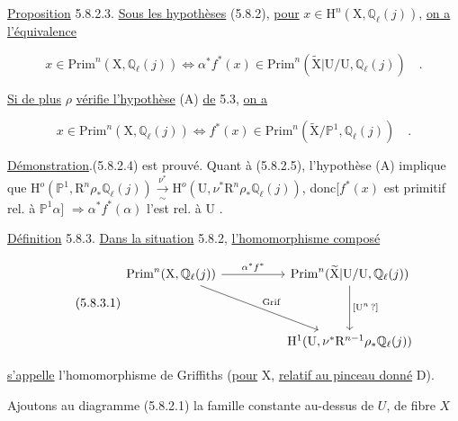 \underline{Proposition} 5.8.2.3. \underline{Sous les hypothèses} (5.8.2), \underline{pour} $x \in \mathrm{H}^n(\mathrm{X},\mathbb{Q}_\ell(j))$, \underline{on a l'équivalence}

\begin{equation}\tag{5.8.2.4}
x \in \mathrm{Prim}^n(\mathrm{X},\mathbb{Q}_\ell(j)) \Longleftrightarrow \alpha^*f^*(x) \in \mathrm{Prim}^n(\widetilde{\mathrm{X}}|\mathrm{U}/\mathrm{U},\mathbb{Q}_\ell(j)) \quad .
\end{equation}

\underline{Si de plus} $\rho$ \underline{vérifie l'hypothèse} (A) \underline{de} 5.3, \underline{on a}

\begin{equation}\tag{5.8.2.5}
x \in \mathrm{Prim}^n(\mathrm{X},\mathbb{Q}_\ell(j)) \Longleftrightarrow f^*(x) \in \mathrm{Prim}^n(\widetilde{\mathrm{X}}/ \mathbb{P}^1,\mathbb{Q}_\ell(j)) \quad .
\end{equation}

\underline{Démonstration}.(5.8.2.4) est prouvé. Quant à (5.8.2.5), l'hypothèse (A) implique que $\mathrm{H}^o(\mathbb{P}^1,\mathrm{R}^n\rho_*\mathbb{Q}_\ell(j)) \overset{\nu^*}{\underset{\sim}{\longrightarrow}} \mathrm{H}^o(\mathrm{U},\nu^*\mathrm{R}^n\rho_*\mathbb{Q}_\ell(j))$, donc[$f^*(x)$ est primitif rel. à $\mathbb{P}^1\alpha$] $\Longrightarrow \alpha^*f^*(\alpha)$ l'est rel. à U .

\underline{Définition} 5.8.3. \underline{Dans la situation} 5.8.2, \underline{l'homomorphisme composé}

\begin{equation}\tag{5.8.3.1}
\begin{tikzcd}[column sep=huge, row sep=huge]
\mathrm{Prim}^n(\mathrm{X},\mathbb{Q}_\ell(j)) \arrow[r, "\alpha^*f^*"] \arrow[dr, "\mathrm{Grif}"] & \mathrm{Prim}^n(\widetilde{\mathrm{X}}|\mathrm{U}/\mathrm{U},\mathbb{Q}_\ell(j)) \arrow[d, "{[\mathrm{U}^n\,?]}"] \\
{} & \mathrm{H}^1(\mathrm{U},\nu^*\mathrm{R}^{n-1}\rho_*\mathbb{Q}_\ell(j))
\end{tikzcd}
\end{equation}

\underline{s'appelle} l'homomorphisme de Griffiths (\underline{pour} X, \underline{relatif au pinceau donné} D).



Ajoutons au diagramme (5.8.2.1) la famille constante au-dessus de $U$, de fibre $X$

